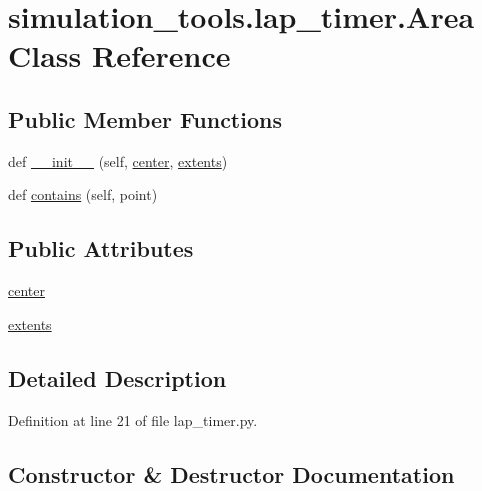 \hypertarget{classsimulation__tools_1_1lap__timer_1_1_area}{}\section{simulation\+\_\+tools.\+lap\+\_\+timer.\+Area Class Reference}
\label{classsimulation__tools_1_1lap__timer_1_1_area}
\subsection*{Public Member Functions}
\begin{DoxyCompactItemize}
\item 
def \hyperlink{classsimulation__tools_1_1lap__timer_1_1_area_a2e75d876da719cbb38730d143eecd8e3}{\+\_\+\+\_\+init\+\_\+\+\_\+} (self, \hyperlink{classsimulation__tools_1_1lap__timer_1_1_area_ab6d54ce6f15f7931e2c97c418ef275ec}{center}, \hyperlink{classsimulation__tools_1_1lap__timer_1_1_area_a5a876b3d7c79ddb803e0e66d851c8c4d}{extents})
\item 
def \hyperlink{classsimulation__tools_1_1lap__timer_1_1_area_a846e52eda13a26067757cabc759a4f1c}{contains} (self, point)
\end{DoxyCompactItemize}
\subsection*{Public Attributes}
\begin{DoxyCompactItemize}
\item 
\hyperlink{classsimulation__tools_1_1lap__timer_1_1_area_ab6d54ce6f15f7931e2c97c418ef275ec}{center}
\item 
\hyperlink{classsimulation__tools_1_1lap__timer_1_1_area_a5a876b3d7c79ddb803e0e66d851c8c4d}{extents}
\end{DoxyCompactItemize}


\subsection{Detailed Description}


Definition at line 21 of file lap\+\_\+timer.\+py.



\subsection{Constructor \& Destructor Documentation}
